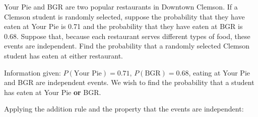 \documentclass[noanswers]{exam}
\begin{document}
\begin{questions}
	
	\question Your Pie and BGR are two popular restaurants in Downtown Clemson. If a Clemson student is randomly selected, suppose the probability that they have eaten at Your Pie is 0.71 and the probability that they have eaten at BGR is 0.68. Suppose that, because each restaurant serves different types of food, these events are independent. Find the probability that a randomly selected Clemson student has eaten at either restaurant.
	
	\begin{solution}[\stretch{1}]
	
	\vspace{3mm}
	
	Information given: $P(\text{Your Pie})=0.71$, $P(\text{BGR})=0.68$, eating at Your Pie and BGR are independent events. We wish to find the probability that a student has eaten at Your Pie \textbf{or} BGR.
	
	\vspace{3mm}
	
	Applying the addition rule and the property that the events are independent:
	

\end{solution}
\end{questions}
\end{document}
